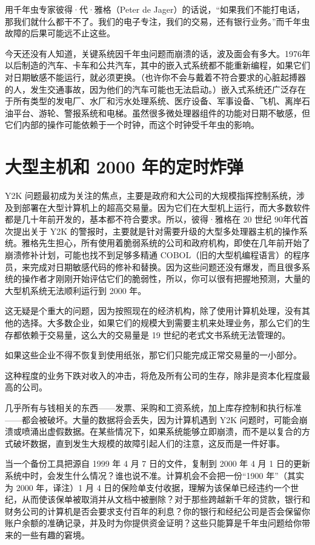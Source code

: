 用千年虫专家彼得·代·雅格（Peter de Jager）的话说，“如果我们不能打电话，那我们就什么都干不了。我们的电子专注，我们的交易，还有银行业务。”而千年虫故障的后果可能远不止这些。


今天还没有人知道，关键系统因千年虫问题而崩溃的话，波及面会有多大。1976年以后制造的汽车、卡车和公共汽车，其中的嵌入式系统都不能重新编程，如果它们对日期敏感不能运行，就必须更换。（也许你不会与戴着不符合要求的心脏起搏器的人，发生交通事故，因为他们的汽车可能也无法启动。）嵌入式系统还广泛存在于所有类型的发电厂、水厂和污水处理系统、医疗设备、军事设备、飞机、离岸石油平台、游轮、警报系统和电梯。虽然很多微处理器组件的功能对日期不敏感，但它们内部的操作可能依赖于一个时钟，而这个时钟受千年虫的影响。


\section{大型主机和 2000 年的定时炸弹}
Y2K 问题最初成为关注的焦点，主要是政府和大公司的大规模指挥控制系统，涉及到部署在大型计算机上的超高交易量。因为它们在大型机上运行，而大多数软件都是几十年前开发的，基本都不符合要求。所以，彼得·雅格在 20 世纪 90年代首次提出关于 Y2K 的警报时，主要就是针对需要升级的大型多处理器主机的操作系统。雅格先生担心，所有使用着脆弱系统的公司和政府机构，即使在几年前开始了崩溃修补计划，可能也找不到足够多精通 COBOL（旧的大型机编程语言）的程序员，来完成对日期敏感代码的修补和替换。因为这些问题还没有爆发，而且很多系统的操作者才刚刚开始评估它们的脆弱性，所以，你可以很有把握地预测，大量的大型机系统无法顺利运行到 2000 年。


这无疑是个重大的问题，因为按照现在的经济机构，除了使用计算机处理，没有其他的选择。大多数企业，如果它们的规模大到需要主机来处理业务，那么它们的生存都依赖于交易量，这么大的交易量是 19 世纪的老式文书系统无法管理的。


如果这些企业不得不恢复到使用纸张，那它们只能完成正常交易量的一小部分。


这种程度的业务下跌对收入的冲击，将危及所有公司的生存，除非是资本化程度最高的公司。


几乎所有与钱相关的东西——发票、采购和工资系统，加上库存控制和执行标准——都会被破坏。大量的数据将会丢失，因为计算机遇到 Y2K 问题时，可能会崩溃或喷涌出虚假数据。在某些情况下，如果系统能够立即崩溃，而不是以复合的方式破坏数据，直到发生大规模的故障引起人们的注意，这反而是一件好事。


当一个备份工具把源自 1999 年 4 月 7 日的文件，复制到 2000 年 4 月 1 日的更新系统中时，会发生什么情况？谁也说不准。计算机会不会把一份“1900 年”（其实为 2000 年，译注）1 月 4 日的保险单支付收据，理解为该保单已经违约一个世纪，从而使该保单被取消并从文档中被删除？对于那些跨越新千年的贷款，银行和财务公司的计算机是否会要求支付百年的利息？你的银行和经纪公司是否会保留你账户余额的准确记录，并及时为你提供资金证明？这些只能算是千年虫问题给你带来的一些有趣的窘境。



